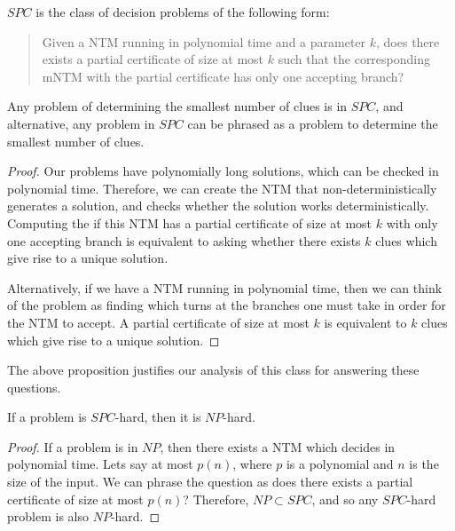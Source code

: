 \documentclass[runningheads,a4paper]{llncs}
\begin{document}
\begin{definition}
$SPC$ is the class of decision problems of the following form:\\
\begin{quote}
Given a NTM running in polynomial time and a parameter $k$, does there exists a partial certificate of size at most $k$ such that the corresponding mNTM with the partial certificate has only one accepting branch?
\end{quote}
\end{definition}

\begin{proposition}
Any problem of determining the smallest number of clues is in $SPC$, and alternative, any problem in $SPC$ can be phrased as a problem to determine the smallest number of clues.
\end{proposition}

\begin{proof}
Our problems have polynomially long solutions, which can be checked in polynomial time. Therefore, we can create the NTM that non-deterministically generates a solution, and checks whether the solution works deterministically. Computing the if this NTM has a partial certificate of size at most $k$ with only one accepting branch is equivalent to asking whether there exists $k$ clues which give rise to a unique solution. 

Alternatively, if we have a NTM running in polynomial time, then we can think of the problem as finding which turns at the branches one must take in order for the NTM to accept. A partial certificate of size at most $k$ is equivalent to $k$ clues which give rise to a unique solution.
\end{proof}

The above proposition justifies our analysis of this class for answering these questions.

\begin{proposition}
If a problem is $SPC$-hard, then it is $NP$-hard.
\end{proposition}

\begin{proof}
If a problem is in $NP$, then there exists a NTM which decides in polynomial time. Lets say at most $p(n)$, where $p$ is a polynomial and $n$ is the size of the input. We can phrase the question as does there exists a partial certificate of size at most $p(n)$? Therefore, $NP \subset SPC$, and so any $SPC$-hard problem is also $NP$-hard. 
\end{proof}
\end{document}
